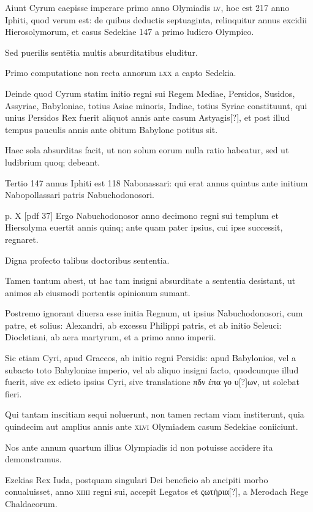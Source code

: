 \begin{parnumbers}
Aiunt
Cyrum caepisse imperare primo anno Olymiadis \textsc{lv}, hoc est 217
anno Iphiti, quod verum est: de quibus deductis septuaginta, relinquitur
annus excidii Hierosolymorum, et casus Sedekiae 147 a primo ludicro
Olympico.

Sed puerilis sentētia multis absurditatibus eluditur.

Primo computatione non recta annorum \textsc{lxx} a capto Sedekia.

Deinde quod Cyrum statim initio regni sui Regem Mediae, Persidos,
Susidos, Assyriae, Babyloniae, totius Asiae minoris, Indiae, totius
Syriae constituunt, qui unius Persidos Rex fuerit aliquot annis ante
casum Astyagis[?], et post illud tempus pauculis annis ante obitum
Babylone potitus sit.

Haec sola absurditas facit, ut non solum eorum
nulla ratio habeatur, sed ut ludibrium quoq; debeant.

Tertio 147 annus
Iphiti est 118 Nabonassari: qui erat annus quintus ante initium Nabopollassari
patris Nabuchodonosori.

\clearpage
p. X [pdf 37]
Ergo Nabuchodonosor anno
decimono regni sui templum et Hiersolyma euertit annis quinq;
ante quam pater ipsius, cui ipse successit, regnaret.

Digna profecto
talibus doctoribus sententia.

Tamen tantum abest, ut hac tam insigni
absurditate a sententia desistant, ut animos ab eiusmodi portentis
opinionum sumant.

Postremo ignorant diuersa esse initia Regnum,
ut ipsius Nabuchodonosori, cum patre, et solius: Alexandri,
ab excessu Philippi patris, et ab initio Seleuci: Diocletiani, ab aera
martyrum, et a primo anno imperii.

Sic etiam Cyri, apud Graecos, ab
initio regni Persidis: apud Babylonios, vel a subacto toto Babyloniae
imperio, vel ab aliquo insigni facto, quodcunque illud fuerit, sive
ex edicto ipsius Cyri, sive translatione \textgreek{πδν ἐπα γο υ[?]ων},
ut solebat fieri.

Qui tantam inscitiam sequi noluerunt, non tamen rectam viam
institerunt, quia quindecim aut amplius annis ante \textsc{xlvi} Olymiadem
casum Sedekiae coniiciunt.

Nos ante annum quartum illius
Olympiadis id non potuisse accidere ita demonstramus. 

Ezekias
Rex Iuda, postquam singulari Dei beneficio ab ancipiti morbo conualuisset,
anno \textsc{xiiii} regni sui, accepit Legatos et \textgreek{ςωτήρια[?]}, a
Merodach Rege Chaldaeorum.


\end{parnumbers}
